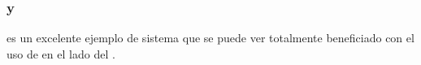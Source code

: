 %
%
%
%
%
%
%


\subsubsection{\nodejsNAME y \ecommerce}

\ecommerce es un excelente ejemplo de sistema que se puede ver totalmente beneficiado con el uso de \nodejsNAME en el lado del \serverAS. 

